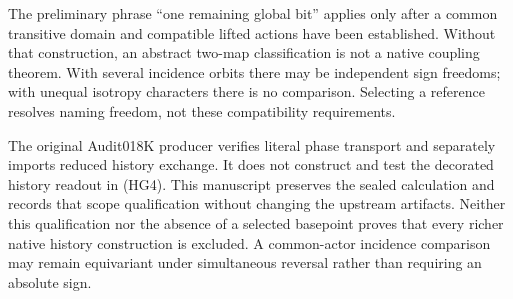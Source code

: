 The preliminary phrase ``one remaining global bit'' applies only after a common transitive domain and compatible lifted actions have been established. Without that construction, an abstract two-map classification is not a native coupling theorem. With several incidence orbits there may be independent sign freedoms; with unequal isotropy characters there is no comparison. Selecting a reference resolves naming freedom, not these compatibility requirements.

The original Audit018K producer verifies literal phase transport and separately imports reduced history exchange. It does not construct and test the decorated history readout in (HG4). This manuscript preserves the sealed calculation and records that scope qualification without changing the upstream artifacts. Neither this qualification nor the absence of a selected basepoint proves that every richer native history construction is excluded. A common-actor incidence comparison may remain equivariant under simultaneous reversal rather than requiring an absolute sign.
